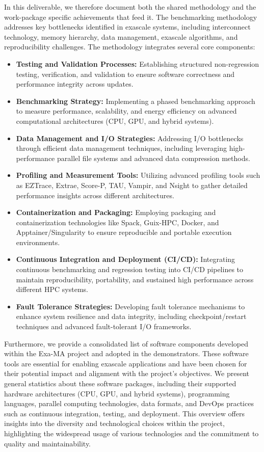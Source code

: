 In this deliverable, we therefore document both the shared methodology and the work-package specific achievements that feed it. The benchmarking methodology addresses key bottlenecks identified in exascale systems, including interconnect technology, memory hierarchy, data management, exascale algorithms, and reproducibility challenges. The methodology integrates several core components:

\begin{itemize}
    \item \textbf{Testing and Validation Processes:} Establishing structured non-regression testing, verification, and validation to ensure software correctness and performance integrity across updates.
    \item \textbf{Benchmarking Strategy:} Implementing a phased benchmarking approach to measure performance, scalability, and energy efficiency on advanced computational architectures (CPU, GPU, and hybrid systems).
    \item \textbf{Data Management and I/O Strategies:} Addressing I/O bottlenecks through efficient data management techniques, including leveraging high-performance parallel file systems and advanced data compression methods.
    \item \textbf{Profiling and Measurement Tools:} Utilizing advanced profiling tools such as EZTrace, Extrae, Score-P, TAU, Vampir, and Nsight to gather detailed performance insights across different architectures.
    \item \textbf{Containerization and Packaging:} Employing packaging and containerization technologies like Spack, Guix-HPC, Docker, and Apptainer/Singularity to ensure reproducible and portable execution environments.
    \item \textbf{Continuous Integration and Deployment (CI/CD):} Integrating continuous benchmarking and regression testing into CI/CD pipelines to maintain reproducibility, portability, and sustained high performance across different HPC systems.
    \item \textbf{Fault Tolerance Strategies:} Developing fault tolerance mechanisms to enhance system resilience and data integrity, including checkpoint/restart techniques and advanced fault-tolerant I/O frameworks.
\end{itemize}

Furthermore, we provide a consolidated list of software components developed within the Exa-MA project and adopted in the demonstrators. These software tools are essential for enabling exascale applications and have been chosen for their potential impact and alignment with the project's objectives. We present general statistics about these software packages, including their supported hardware architectures (CPU, GPU, and hybrid systems), programming languages, parallel computing technologies, data formats, and DevOps practices such as continuous integration, testing, and deployment. This overview offers insights into the diversity and technological choices within the project, highlighting the widespread usage of various technologies and the commitment to quality and maintainability.

